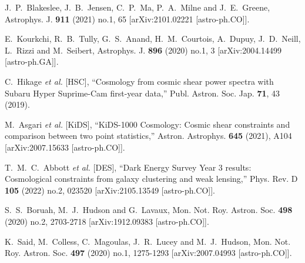 \documentclass[a4paper,11pt]{article}
\begin{document}
\begin{thebibliography}{99}
J.~P.~Blakeslee, J.~B.~Jensen, C.~P.~Ma, P.~A.~Milne and J.~E.~Greene,
Astrophys. J. \textbf{911} (2021) no.1, 65
[arXiv:2101.02221 [astro-ph.CO]].

E.~Kourkchi, R.~B.~Tully, G.~S.~Anand, H.~M.~Courtois, A.~Dupuy, J.~D.~Neill, L.~Rizzi and M.~Seibert,
Astrophys. J. \textbf{896} (2020) no.1, 3
[arXiv:2004.14499 [astro-ph.GA]].

C.~Hikage \textit{et al.} [HSC],
``Cosmology from cosmic shear power spectra with Subaru Hyper Suprime-Cam first-year data,''
Publ. Astron. Soc. Jap. \textbf{71}, 43  (2019).

M.~Asgari \textit{et al.} [KiDS],
``KiDS-1000 Cosmology: Cosmic shear constraints and comparison between two point statistics,''
Astron. Astrophys. \textbf{645} (2021), A104
[arXiv:2007.15633 [astro-ph.CO]].

T.~M.~C.~Abbott \textit{et al.} [DES],
``Dark Energy Survey Year 3 results: Cosmological constraints from galaxy clustering and weak lensing,''
Phys. Rev. D \textbf{105} (2022) no.2, 023520
[arXiv:2105.13549 [astro-ph.CO]].

S.~S.~Boruah, M.~J.~Hudson and G.~Lavaux,
Mon. Not. Roy. Astron. Soc. \textbf{498} (2020) no.2, 2703-2718
[arXiv:1912.09383 [astro-ph.CO]].

K.~Said, M.~Colless, C.~Magoulas, J.~R.~Lucey and M.~J.~Hudson,
Mon. Not. Roy. Astron. Soc. \textbf{497} (2020) no.1, 1275-1293
[arXiv:2007.04993 [astro-ph.CO]].


\end{thebibliography}
\end{document}
